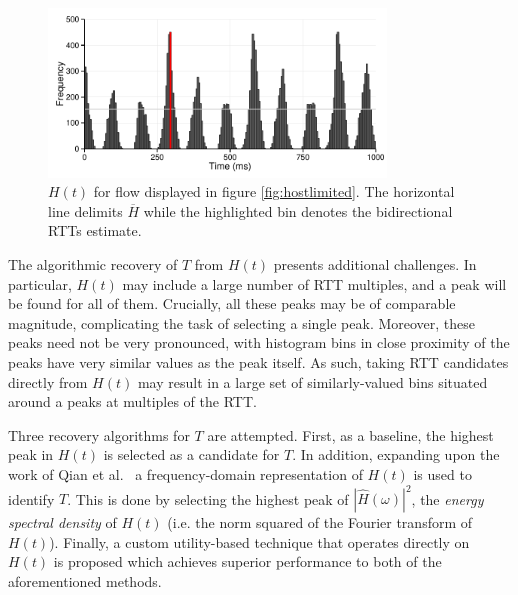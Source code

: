 \begin{figure}
  \centering
  \includegraphics[width=0.8\textwidth]{figures/malawi/rttbin.pdf}
  \caption[$H(t)$ for flow displayed in figure \ref{fig:hostlimited}.]{$H(t)$ for flow displayed in figure \ref{fig:hostlimited}. The horizontal line delimits $\overline{H}$ while the highlighted bin denotes the bidirectional \acp{RTT} estimate.\label{fig:histogram}}
\end{figure}

%
%
The algorithmic recovery of $T$ from $H(t)$ presents additional challenges. 
In particular, $H(t)$ may include a large number of \ac{RTT} multiples, and a peak will be found for all of them. 
Crucially, all these peaks may be of comparable magnitude, complicating the task of selecting a single peak.
Moreover, these peaks need not be very pronounced, with histogram bins in close proximity of the peaks have very similar values as the peak itself. 
As such, taking \ac{RTT} candidates directly from $H(t)$ may result in a large set of similarly-valued bins situated around a peaks at multiples of the \ac{RTT}. 

Three recovery algorithms for $T$ are attempted.
First, as a baseline, the highest peak in $H(t)$ is selected as a candidate for $T$. 
In addition, expanding upon the work of Qian et al.\ \cite{Qian:2009p429} a frequency-domain representation of $H(t)$ is used to identify $T$. 
This is done by selecting the highest peak of $|\hat{H}(\omega)|^2$, the \emph{energy spectral density} of $H(t)$ (i.e. the norm squared of the Fourier transform of $H(t)$). 
Finally, a custom utility-based technique that operates directly on $H(t)$ is proposed which achieves superior performance to both of the aforementioned methods.

